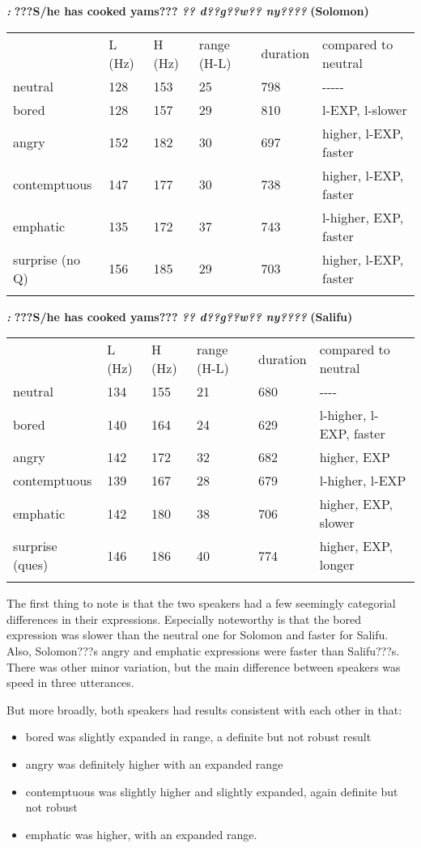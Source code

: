 \documentclass[output=paper]{langsci/langscibook}
\begin{document}
\emph{\textbf{\textup{:}}}\textbf{ ???}\textbf{S/he has cooked yams???  }\emph{\textbf{?? d??g??w?? ny????}}\textbf{  (Solomon) }

\begin{tabular}{llllll} & L (Hz) & H (Hz) & range (H-L) & duration & compared to neutral\\
\lsptoprule
neutral & 128 & 153 & 25 & 798 & {}-{}-{}-{}-{}-\\
bored & 128 & 157 & 29 & 810 & l-EXP, l-slower\\
angry & 152 & 182 & 30 & 697 & higher, l-EXP, faster\\
contemptuous & 147 & 177 & 30 & 738 & higher, l-EXP, faster\\
emphatic & 135 & 172 & 37 & 743 & l-higher, EXP, faster\\
surprise (no Q) & 156 & 185 & 29 & 703 & higher, l-EXP, faster\\
\lspbottomrule
\end{tabular}
\emph{\textbf{\textup{:}}}\textbf{ ???}\textbf{S/he has cooked yams???  }\emph{\textbf{?? d??g??w?? ny????}}\textbf{  (Salifu)}

\begin{tabular}{llllll} & L (Hz) & H (Hz) & range (H-L) & duration & compared to neutral\\
\lsptoprule
neutral & 134 & 155 & 21 & 680 & {}-{}-{}-{}-\\
bored & 140 & 164 & 24 & 629 & l-higher, l-EXP, faster\\
angry & 142 & 172 & 32 & 682 & higher, EXP\\
contemptuous & 139 & 167 & 28 & 679 & l-higher, l-EXP\\
emphatic & 142 & 180 & 38 & 706 & higher, EXP, slower\\
surprise (ques) & 146 & 186 & 40 & 774 & higher, EXP, longer\\
\lspbottomrule
\end{tabular}
The first thing to note is that the two speakers had a few seemingly categorial differences in their expressions. Especially noteworthy is that the bored expression was slower than the neutral one for Solomon and faster for Salifu. Also, Solomon???s angry and emphatic expressions were faster than Salifu???s. There was other minor variation, but the main difference between speakers was speed in three utterances.

But more broadly, both speakers had results consistent with each other in that:

\begin{itemize}
\item bored was slightly expanded in range, a definite but not robust result
\item angry was definitely higher with an expanded range
\item contemptuous was slightly higher and slightly expanded, again definite but not robust
\item emphatic was higher, with an expanded range. 
\end{itemize}
\end{document}
